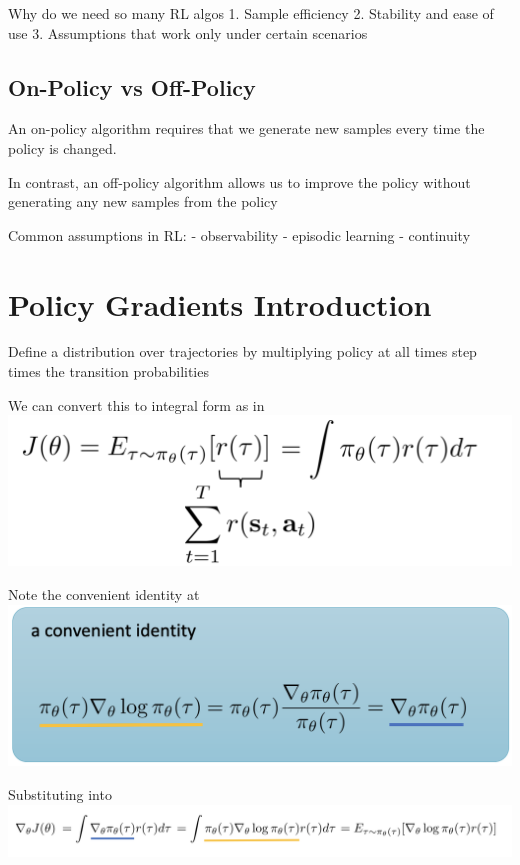 \documentclass{article}
\begin{document}
Why do we need so many RL algos
1. Sample efficiency
2. Stability and ease of use
3. Assumptions that work only under certain scenarios

\subsection{On-Policy vs Off-Policy}
An on-policy algorithm requires that we generate new samples every time the policy is changed.

In contrast, an off-policy algorithm allows us to improve the policy without generating any new samples from the policy

Common assumptions in RL:
- observability
- episodic learning
- continuity



\section{Policy Gradients Introduction}
Define a distribution over trajectories by multiplying policy at all times step times the transition probabilities

We can convert this to integral form as in \includegraphics[scale=0.5]{integral_form}

Note the convenient identity at \includegraphics[scale=0.5]{convenient_identity}

Substituting into \includegraphics[scale=0.25]{integral_substitution}
\end{document}
